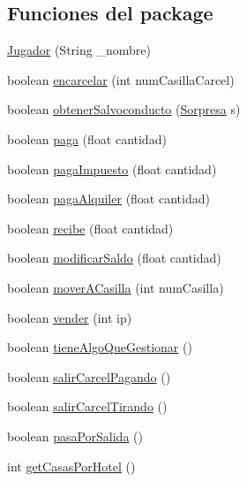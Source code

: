 \subsection*{Funciones del \textquotesingle{}package\textquotesingle{}}
\begin{DoxyCompactItemize}
\item 
\hyperlink{classcivitas_1_1Jugador_a493ce0ae2a6589460ff693b7c53fbd1e}{Jugador} (String \+\_\+nombre)
\item 
boolean \hyperlink{classcivitas_1_1Jugador_acc3fb8fdf45c820102c69472605abd3f}{encarcelar} (int num\+Casilla\+Carcel)
\item 
boolean \hyperlink{classcivitas_1_1Jugador_a0e052cf2f305003ab8a2084b643ff9bb}{obtener\+Salvoconducto} (\hyperlink{classcivitas_1_1Sorpresa}{Sorpresa} s)
\item 
boolean \hyperlink{classcivitas_1_1Jugador_a5a7a0ba48bd151a808fa2f3edeecf75f}{paga} (float cantidad)
\item 
boolean \hyperlink{classcivitas_1_1Jugador_a5d3aa6cc2657a3f7e5b31c947e9035ca}{paga\+Impuesto} (float cantidad)
\item 
boolean \hyperlink{classcivitas_1_1Jugador_af63b04e25bc75ac3857bf0d6766cfc72}{paga\+Alquiler} (float cantidad)
\item 
boolean \hyperlink{classcivitas_1_1Jugador_aeadc08e13f894f3b86f004bfede49b8a}{recibe} (float cantidad)
\item 
boolean \hyperlink{classcivitas_1_1Jugador_ae091c2f1256a809aab42c1478056a861}{modificar\+Saldo} (float cantidad)
\item 
boolean \hyperlink{classcivitas_1_1Jugador_af227e8b7b1b41f042f24e7f65062aa7c}{mover\+A\+Casilla} (int num\+Casilla)
\item 
boolean \hyperlink{classcivitas_1_1Jugador_aa9a90b759adaccfd58e322c5518bb0f9}{vender} (int ip)
\item 
boolean \hyperlink{classcivitas_1_1Jugador_a076d9059f63b0176becea3c15dc98493}{tiene\+Algo\+Que\+Gestionar} ()
\item 
boolean \hyperlink{classcivitas_1_1Jugador_ac084bcf2599582f25908cc4214cb6937}{salir\+Carcel\+Pagando} ()
\item 
boolean \hyperlink{classcivitas_1_1Jugador_a2c4106981ddfb43872df3303685739c1}{salir\+Carcel\+Tirando} ()
\item 
boolean \hyperlink{classcivitas_1_1Jugador_ac876d67da8365c7a97767a2930113c72}{pasa\+Por\+Salida} ()
\item 
int \hyperlink{classcivitas_1_1Jugador_a0fd044d8f7c6d61718b389124f93ec17}{get\+Casas\+Por\+Hotel} ()

\end{DoxyCompactItemize}
